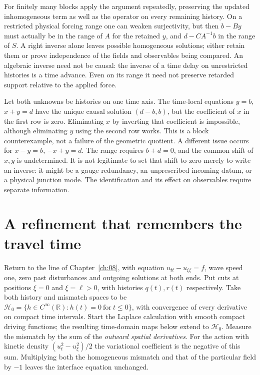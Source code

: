For finitely many blocks apply the argument repeatedly, preserving the updated inhomogeneous term as well as the operator on every remaining history. On a restricted physical forcing range one can weaken surjectivity, but then $b-B y$ must actually be in the range of $A$ for the retained $y$, and $d-CA^{-1}b$ in the range of $S$. A right inverse alone leaves possible homogeneous solutions; either retain them or prove independence of the fields and observables being compared. An algebraic inverse need not be causal: the inverse of a time delay on unrestricted histories is a time advance. Even on its range it need not preserve retarded support relative to the applied force.

\begin{remark}
Let both unknowns be histories on one time axis. The time-local equations $y=b$, $x+y=d$ have the unique causal solution $(d-b,b)$, but the coefficient of $x$ in the first row is zero. Eliminating $x$ by inverting that coefficient is impossible, although eliminating $y$ using the second row works. This is a block counterexample, not a failure of the geometric quotient. A different issue occurs for $x-y=b$, $-x+y=d$. The range requires $b+d=0$, and the common shift of $x,y$ is undetermined. It is not legitimate to set that shift to zero merely to write an inverse: it might be a gauge redundancy, an unprescribed incoming datum, or a physical junction mode. The identification and its effect on observables require separate information.
\end{remark}

\section{A refinement that remembers the travel time}

Return to the line of Chapter~\ref{ch:08}, with equation $u_{tt}-u_{\xi\xi}=f$, wave speed one, zero past disturbances and outgoing solutions at both ends. Put cuts at positions $\xi=0$ and $\xi=\ell>0$, with histories $q(t),r(t)$ respectively. Take both history and mismatch spaces to be $\mathcal H_0=\{h\in C^\infty(\mathbb R):h(t)=0\ \text{for}\ t\leq0\}$, with convergence of every derivative on compact time intervals. Start the Laplace calculation with smooth compact driving functions; the resulting time-domain maps below extend to $\mathcal H_0$. Measure the mismatch by the sum of the \emph{outward spatial derivatives}. For the action with kinetic density $(u_t^2-u_\xi^2)/2$ the variational coefficient is the negative of this sum. Multiplying both the homogeneous mismatch and that of the particular field by $-1$ leaves the interface equation unchanged.

